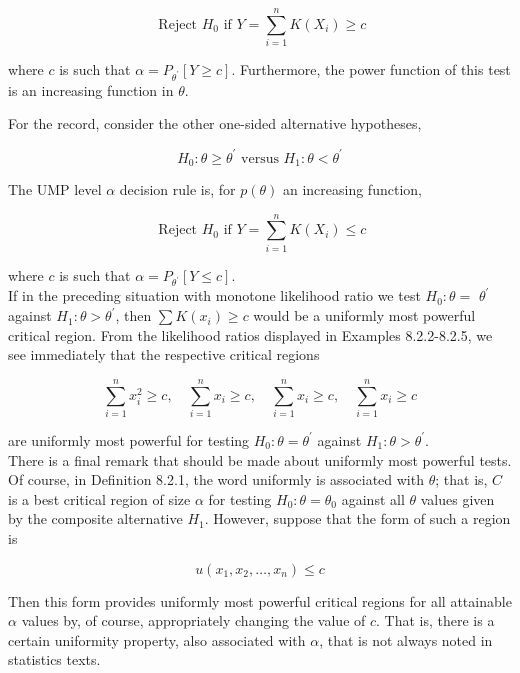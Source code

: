 $$
\text { Reject } H_{0} \text { if } Y=\sum_{i=1}^{n} K\left(X_{i}\right) \geq c
$$

where $c$ is such that $\alpha=P_{\theta^{\prime}}[Y \geq c]$. Furthermore, the power function of this test is an increasing function in $\theta$.

For the record, consider the other one-sided alternative hypotheses,


\begin{equation*}
H_{0}: \theta \geq \theta^{\prime} \text { versus } H_{1}: \theta<\theta^{\prime} \tag{8.2.6}
\end{equation*}


The UMP level $\alpha$ decision rule is, for $p(\theta)$ an increasing function,

$$
\text { Reject } H_{0} \text { if } Y=\sum_{i=1}^{n} K\left(X_{i}\right) \leq c
$$

where $c$ is such that $\alpha=P_{\theta^{\prime}}[Y \leq c]$.\\
If in the preceding situation with monotone likelihood ratio we test $H_{0}: \theta=$ $\theta^{\prime}$ against $H_{1}: \theta>\theta^{\prime}$, then $\sum K\left(x_{i}\right) \geq c$ would be a uniformly most powerful critical region. From the likelihood ratios displayed in Examples 8.2.2-8.2.5, we see immediately that the respective critical regions

$$
\sum_{i=1}^{n} x_{i}^{2} \geq c, \quad \sum_{i=1}^{n} x_{i} \geq c, \quad \sum_{i=1}^{n} x_{i} \geq c, \quad \sum_{i=1}^{n} x_{i} \geq c
$$

are uniformly most powerful for testing $H_{0}: \theta=\theta^{\prime}$ against $H_{1}: \theta>\theta^{\prime}$.\\
There is a final remark that should be made about uniformly most powerful tests. Of course, in Definition 8.2.1, the word uniformly is associated with $\theta$; that is, $C$ is a best critical region of size $\alpha$ for testing $H_{0}: \theta=\theta_{0}$ against all $\theta$ values given by the composite alternative $H_{1}$. However, suppose that the form of such a region is

$$
u\left(x_{1}, x_{2}, \ldots, x_{n}\right) \leq c
$$

Then this form provides uniformly most powerful critical regions for all attainable $\alpha$ values by, of course, appropriately changing the value of $c$. That is, there is a certain uniformity property, also associated with $\alpha$, that is not always noted in statistics texts.

